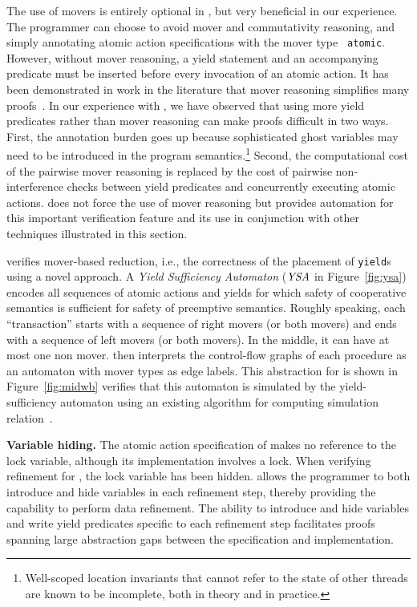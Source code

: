 The use of movers is entirely optional in \civl, but very beneficial
in our experience. The programmer can choose to avoid mover and
commutativity reasoning, and simply
annotating atomic action specifications with the mover type {\tt
  atomic}.
However, without mover reasoning,  a yield statement and an
accompanying predicate
must be inserted before every invocation of an atomic action.
It has been demonstrated in work in the literature that mover
reasoning simplifies many proofs~\cite{ElmasQT09}. 
In our experience with \civl, we have observed that using more yield
predicates rather than mover reasoning can make proofs difficult in two ways.
First, the annotation burden goes up because sophisticated ghost variables may need to be introduced in the 
program semantics.\footnote{Well-scoped location invariants that cannot refer to the state of other threads are known to be incomplete, 
both in theory and in practice.}
Second, the computational cost of the pairwise mover reasoning is replaced by the cost of pairwise non-interference checks between yield predicates 
and concurrently executing atomic actions. 
\civl does not force the use of mover
reasoning but provides automation for this important verification
feature and its use in conjunction with other techniques illustrated in
this section. 

\civl verifies mover-based reduction, i.e., the correctness of the placement of {\tt yield}s using a novel  approach.
A {\em Yield
  Sufficiency Automaton\/} ($\mathit{YSA}$ in Figure~\ref{fig:ysa}) encodes all sequences of atomic actions and yields for which safety of cooperative semantics is sufficient 
for safety of preemptive semantics. 
Roughly speaking, each ``transaction'' starts with a sequence of right movers (or both movers) and ends with a sequence of left movers (or both movers).
In the middle, it can have at most one non mover.
\civl then interprets the control-flow graphs of each procedure as an automaton with mover types as edge labels. 
This abstraction for  is shown in Figure~\ref{fig:midwb}
\civl verifies that this automaton is simulated by the yield-sufficiency automaton using an existing algorithm for computing simulation relation~\cite{HenzingerHK95}.

{\bf Variable hiding.}
The atomic action specification of  makes no reference to the lock variable, although its implementation involves a lock. 
When verifying refinement for , the lock variable has been hidden. 
\civl allows the programmer to both introduce and hide variables in
each refinement step, thereby providing the capability to perform data refinement.
The ability to introduce and hide variables and write yield predicates specific to each refinement step 
facilitates proofs spanning large abstraction gaps between the specification and implementation.

